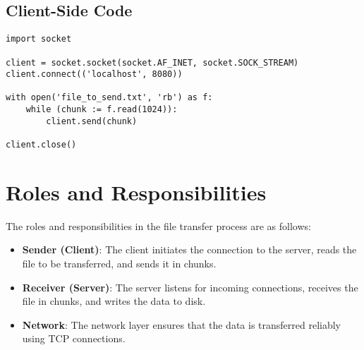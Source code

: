 \documentclass{article}
\begin{document}
\subsection{Client-Side Code}
\begin{verbatim}
import socket

client = socket.socket(socket.AF_INET, socket.SOCK_STREAM)
client.connect(('localhost', 8080))

with open('file_to_send.txt', 'rb') as f:
    while (chunk := f.read(1024)):
        client.send(chunk)

client.close()
\end{verbatim}

\section{Roles and Responsibilities}
The roles and responsibilities in the file transfer process are as follows:

\begin{itemize}
    \item \textbf{Sender (Client)}: The client initiates the connection to the server, reads the file to be transferred, and sends it in chunks.
    \item \textbf{Receiver (Server)}: The server listens for incoming connections, receives the file in chunks, and writes the data to disk.
    \item \textbf{Network}: The network layer ensures that the data is transferred reliably using TCP connections.
\end{itemize}
\end{document}
